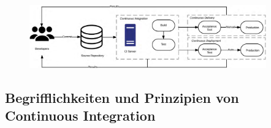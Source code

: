\begin{figure}[H]
    \centering
    \includegraphics[width=0.91\textwidth]{images/content/ci-cde-cd}
    \label{fig:ci-cde-cd}
\end{figure}

\subsection{Begrifflichkeiten und Prinzipien von Continuous Integration} \label{subsec:02-background-2}

